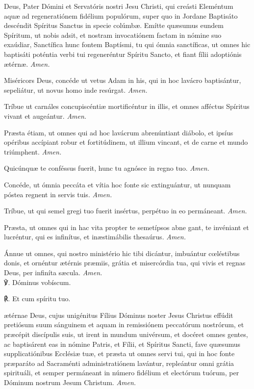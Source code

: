 { Deus, Pater Dómini et Servatóris nostri Jesu Christi, qui creásti Eleméntum aqu{\ae} ad regeneratiónem fidélium populórum, super quo in Jordane Baptisáto descéndit Spíritus Sanctus in specie colúmb{\ae}. Emítte qu{\ae}sumus eundem Spíritum, ut nobis adsit, et nostram invocatiónem factam in nómine suo exaúdiar, Sanctífica {} hunc fontem Baptísmi, tu qui ómnia sanctíficas, ut omnes hic baptisáti poténtia verbi tui regeneréntur Spíritu Sancto, et fiant fílii adoptiónis {\ae}térn{\ae}. \textit{Amen.}

Miséricors Deus, concéde ut vetus Adam in his, qui in hoc lavácro baptisántur, sepeliátur, ut novus homo inde resúrgat. \textit{Amen.}

Tríbue ut carnáles concupiscénti{\ae} mortificéntur in illis, et omnes afféctus Spíritus vivant et augeántur. \textit{Amen.}

Pr{\ae}sta étiam, ut omnes qui ad hoc lavácrum abrenúntiant diábolo, et ipsíus opéribus accípiant robur et fortitúdinem, ut illium vincant, et de carne et mundo triúmphent. \textit{Amen.}

Quicúnqu{\ae} te conféssus fuerit, hunc tu agnósce in regno tuo. \textit{Amen.}

Concéde, ut ómnia peccáta et vítia hoc fonte sic extinguántur, ut nunquam póstea regnent in servis tuis. \textit{Amen.}

Tríbue, ut qui semel gregi tuo fuerit insértus, perpétuo in eo permáneant. \textit{Amen.}

Pr{\ae}sta, ut omnes qui in hac vita propter te semetípsos abne gant, te invéniant et lucréntur, qui es infinítus, et in{\ae}stimábilis thesaúrus. \textit{Amen.}

Ánnue ut omnes, qui nostro ministério hic tibi dicántur, imbuántur c{\oe}léstibus donis, et ornéntur {\ae}térnis pr{\ae}miis, grátia et misercórdia tua, qui vivis et regnas Deus, per infiníta s{\ae}cula. \textit{Amen.}\\

℣. Dóminus vobíscum.

℟. Et cum spíritu tuo.\\

\vspace{2\baselineskip}

\oremuslatin
{} {\ae}térnae Deus, cujus unigénitus Fílius Dóminus noster Jesus Christus effúdit pretiósum suum sánguinem et aquam in remissiónem peccatórum nostrórum, et pr{\ae}cépit discípulis suis, ut irent in mundum univérsum, et docéret omnes gentes, ac baptisárent eas in nómine Patris, et Fílii, et Spíritus Sancti, fave qu{\ae}sumus supplicatiónibus Ecclési{\ae} tu{\ae}, et pr{\ae}sta ut omnes servi tui, qui in hoc fonte pr{\ae}paráto ad Sacraménti administratiónem lavántur, repleántur omni grátia spirituáli, et semper permáneant in número fidélium et electórum tuórum, per Dóminum nostrum Jesum Christum. \textit{Amen.}
}

